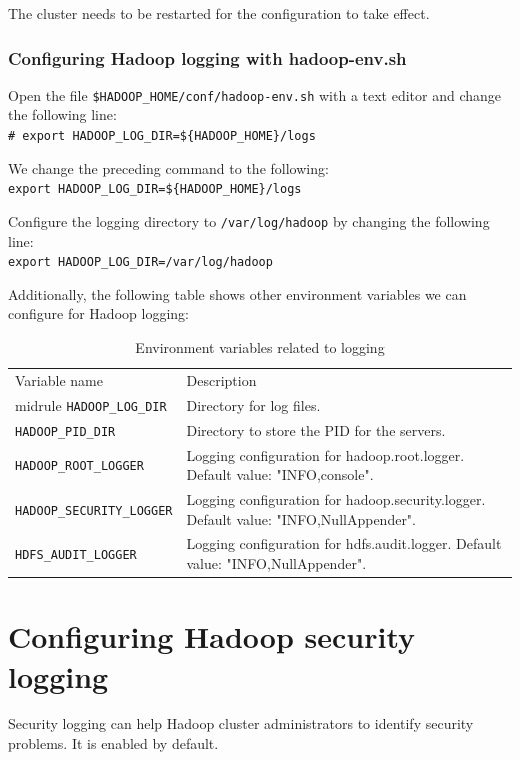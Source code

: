 The cluster needs to be restarted for the configuration to take effect.

\subsubsection*{Configuring Hadoop logging with hadoop-env.sh}
Open the file \verb|$HADOOP_HOME/conf/hadoop-env.sh| with a text editor and change the following line: \\
\verb|# export HADOOP_LOG_DIR=${HADOOP_HOME}/logs|

We change the preceding command to the following: \\
\verb|export HADOOP_LOG_DIR=${HADOOP_HOME}/logs|

Configure the logging directory to \verb|/var/log/hadoop| by changing the following line: \\
\verb|export HADOOP_LOG_DIR=/var/log/hadoop|

Additionally, the following table shows other environment variables we can configure for Hadoop logging:
\begin{table}\scriptsize\centering
  \begin{tabular}{ll}
    \toprule 
    Variable name & Description \\ midrule
    \verb|HADOOP_LOG_DIR| & Directory for log files. \\ 
    \verb|HADOOP_PID_DIR| & Directory to store the PID for the servers. \\
    \verb|HADOOP_ROOT_LOGGER| & Logging configuration for hadoop.root.logger. Default value: "INFO,console". \\
    \verb|HADOOP_SECURITY_LOGGER| & Logging configuration for hadoop.security.logger. Default value: "INFO,NullAppender".\\
    \verb|HDFS_AUDIT_LOGGER| & Logging configuration for hdfs.audit.logger. Default value: "INFO,NullAppender".\\ \bottomrule 
  \end{tabular}
  \caption{Environment variables related to logging}\label{tbl:loggingenv}
\end{table}

\section{Configuring Hadoop security logging}
Security logging can help Hadoop cluster administrators to identify security problems. It is enabled by default.

